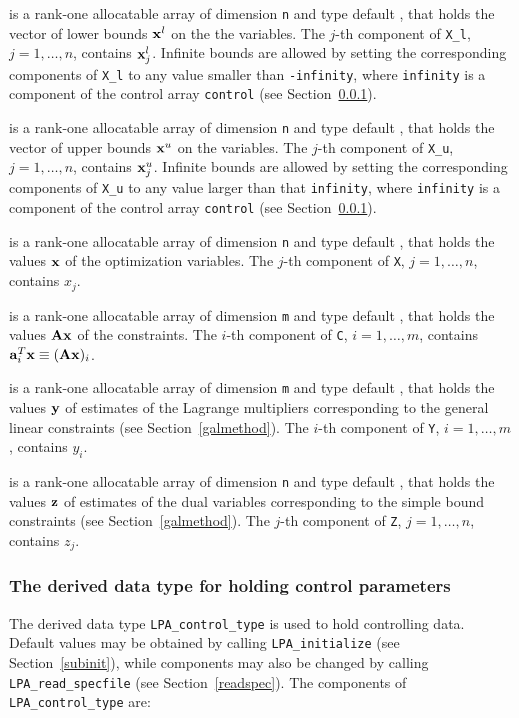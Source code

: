 \documentclass{galahad}
\newcommand{\packagename}{LPA}
\begin{document}
\begin{description}
 is a rank-one allocatable array of dimension {\tt n} and type
default \realdp, that holds
the vector of lower bounds ${\mathbf{x}}^{l}$ on the the variables.
The $j$-th component of {\tt X\_l}, $j = 1, \ldots , n$,
contains ${\mathbf{x}}_{j}^{l}$.
Infinite bounds are allowed by setting the corresponding
components of {\tt X\_l} to any value smaller than {\tt -infinity},
where {\tt infinity} is a component of the control array {\tt control}
(see Section~\ref{typecontrol}).

 is a rank-one allocatable array of dimension {\tt n} and type
default \realdp, that holds
the vector of upper bounds ${\mathbf{x}}^{u}$ on the variables.
The $j$-th component of {\tt X\_u}, $j = 1, \ldots , n$,
contains ${\mathbf{x}}_{j}^{u}$.
Infinite bounds are allowed by setting the corresponding
components of {\tt X\_u} to any value larger than that {\tt infinity},
where {\tt infinity} is a component of the control array {\tt control}
(see Section~\ref{typecontrol}).

 is a rank-one allocatable array of dimension {\tt n} and type
default \realdp,
that holds the values ${\mathbf{x}}$ of the optimization variables.
The $j$-th component of {\tt X}, $j = 1,  \ldots , n$, contains $x_{j}$.

 is a rank-one allocatable array of dimension {\tt m} and type default
\realdp, that holds
the values ${\mathbf{A}} {\mathbf{x}}$ of the constraints.
The $i$-th component of {\tt C}, $i = 1,  \ldots ,  m$, contains
${\mathbf{a}}_{i}^{T}{\mathbf{x}} \equiv ({\mathbf{A}} {\mathbf{x}})_{i}$.

 is a rank-one allocatable array of dimension {\tt m} and type
default \realdp, that holds
the values ${\mathbf{y}}$ of estimates  of the Lagrange multipliers
corresponding to the general linear constraints (see Section~\ref{galmethod}).
The $i$-th component of {\tt Y}, $i = 1,  \ldots ,  m$, contains $y_{i}$.

 is a rank-one allocatable array of dimension {\tt n} and type default
\realdp, that holds
the values ${\mathbf{z}}$ of estimates  of the dual variables
corresponding to the simple bound constraints (see Section~\ref{galmethod}).
The $j$-th component of {\tt Z}, $j = 1,  \ldots ,  n$, contains $z_{j}$.

\end{description}


\subsubsection{The derived data type for holding control
 parameters}\label{typecontrol}
The derived data type
{\tt \packagename\_control\_type}
is used to hold controlling data. Default values may be obtained by calling
{\tt \packagename\_initialize}
(see Section~\ref{subinit}),
while components may also be changed by calling
{\tt \packagename\_read\-\_specfile}
(see Section~\ref{readspec}).
The components of
{\tt \packagename\_control\_type}
are:
\end{document}
